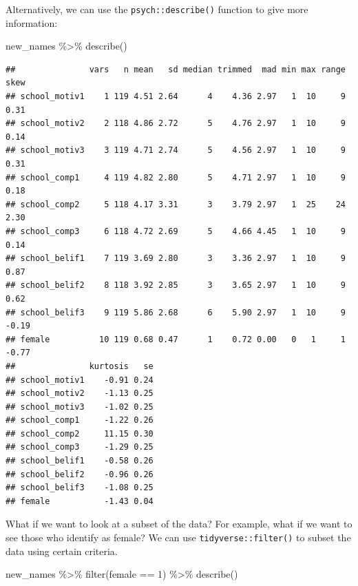 \documentclass[
]{article}
\newenvironment{Shaded}{\begin{snugshade}}{\end{snugshade}}
\newcommand{\DecValTok}[1]{\textcolor[rgb]{0.00,0.00,0.81}{#1}}
\newcommand{\FunctionTok}[1]{\textcolor[rgb]{0.00,0.00,0.00}{#1}}
\newcommand{\NormalTok}[1]{#1}
\newcommand{\SpecialCharTok}[1]{\textcolor[rgb]{0.00,0.00,0.00}{#1}}
\begin{document}
Alternatively, we can use the \texttt{psych::describe()} function to
give more information:

\begin{Shaded}
\begin{Highlighting}[]
\NormalTok{new\_names }\SpecialCharTok{\%\textgreater{}\%} 
  \FunctionTok{describe}\NormalTok{()}
\end{Highlighting}
\end{Shaded}

\begin{verbatim}
##               vars   n mean   sd median trimmed  mad min max range  skew
## school_motiv1    1 119 4.51 2.64      4    4.36 2.97   1  10     9  0.31
## school_motiv2    2 118 4.86 2.72      5    4.76 2.97   1  10     9  0.14
## school_motiv3    3 119 4.71 2.74      5    4.56 2.97   1  10     9  0.31
## school_comp1     4 119 4.82 2.80      5    4.71 2.97   1  10     9  0.18
## school_comp2     5 118 4.17 3.31      3    3.79 2.97   1  25    24  2.30
## school_comp3     6 118 4.72 2.69      5    4.66 4.45   1  10     9  0.14
## school_belif1    7 119 3.69 2.80      3    3.36 2.97   1  10     9  0.87
## school_belif2    8 118 3.92 2.85      3    3.65 2.97   1  10     9  0.62
## school_belif3    9 119 5.86 2.68      6    5.90 2.97   1  10     9 -0.19
## female          10 119 0.68 0.47      1    0.72 0.00   0   1     1 -0.77
##               kurtosis   se
## school_motiv1    -0.91 0.24
## school_motiv2    -1.13 0.25
## school_motiv3    -1.02 0.25
## school_comp1     -1.22 0.26
## school_comp2     11.15 0.30
## school_comp3     -1.29 0.25
## school_belif1    -0.58 0.26
## school_belif2    -0.96 0.26
## school_belif3    -1.08 0.25
## female           -1.43 0.04
\end{verbatim}

What if we want to look at a subset of the data? For example, what if we
want to see those who identify as female? We can use
\texttt{tidyverse::filter()} to subset the data using certain criteria.

\begin{Shaded}
\begin{Highlighting}[]
\NormalTok{new\_names }\SpecialCharTok{\%\textgreater{}\%} 
  \FunctionTok{filter}\NormalTok{(female }\SpecialCharTok{==} \DecValTok{1}\NormalTok{) }\SpecialCharTok{\%\textgreater{}\%} 
  \FunctionTok{describe}\NormalTok{()}
\end{Highlighting}
\end{Shaded}
\end{document}
